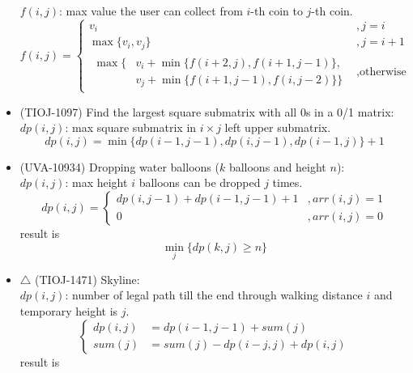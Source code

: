 \begin{itemize}
    $f(i, j)$: max value the user can collect from $i$-th coin to $j$-th coin.\begin{equation}
        f(i, j) = \begin{cases}
            v_i &, j = i \\
            \max\{v_i, v_j\} &, j = i + 1 \\
            \begin{aligned}
                \max\{& v_i + \min\{f(i + 2, j), f(i + 1, j -1)\}, \\
                & v_j + \min\{f(i + 1, j -1), f(i, j - 2)\}\}
            \end{aligned} &, \text{otherwise}
        \end{cases}
    \end{equation}
    \item (TIOJ-1097) Find the largest square submatrix with all 0s in a 0/1 matrix: \\ 
    $dp(i, j)$: max square submatrix in $i \times j$ left upper submatrix. \begin{equation}
        dp(i, j) = \min\{dp(i − 1, j − 1), dp(i, j − 1), dp(i − 1,j)\} + 1
    \end{equation}
    \item (UVA-10934) Dropping water balloons ($k$ balloons and height $n$): \\ 
    $dp(i, j)$: max height $i$ balloons can be dropped $j$ times. \begin{equation}
        dp(i, j) = \begin{cases}
            dp(i, j - 1) + dp(i - 1, j - 1) + 1 &, arr(i, j) = 1 \\
            0 &, arr(i, j) = 0
        \end{cases}
    \end{equation} result is \begin{equation}
        \min_{j} \{dp(k, j) \ge n\}
    \end{equation}
    \item $\bigtriangleup$ (TIOJ-1471) Skyline: \\ 
    $dp(i, j)$: number of legal path till the end through walking distance $i$ and temporary height is $j$. \begin{equation}
        \begin{cases}
            dp(i, j) & = dp(i - 1, j - 1) + sum(j) \\
            sum(j) & = sum(j) - dp(i - j, j) + dp(i, j)
        \end{cases}
    \end{equation} result is \begin{equation}

\end{equation}
\end{itemize}
